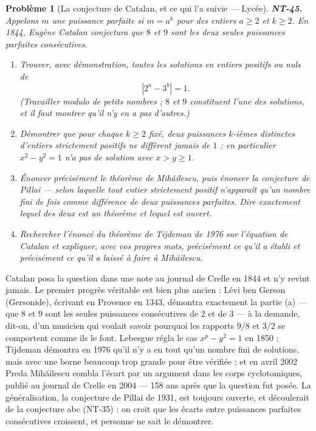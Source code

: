\documentclass[11pt]{article}
\newtheorem{problem}{Problème}
\begin{document}
\bigskip

\begin{problem}[{La conjecture de Catalan, et ce qui l'a suivie --- Lycée}]
\textbf{NT-45.} Appelons $ m $ une \textit{puissance parfaite} si $ m = a^k $ pour des entiers
$ a \ge 2 $ et $ k \ge 2 $. En 1844, Eugène Catalan conjectura que $ 8 $ et $ 9 $
sont les deux seules puissances parfaites consécutives.
\begin{enumerate}
\item[(a)] Trouver, avec démonstration, toutes les solutions en entiers positifs ou nuls de
\[ \left| 2^{a} - 3^{b} \right| = 1 . \]
(Travailler modulo de petits nombres ; $ 8 $ et $ 9 $ constituent l'une des solutions, et il faut
montrer qu'il n'y en a pas d'autres.)
\item[(b)] Démontrer que pour chaque $ k \ge 2 $ fixé, deux puissances $ k $-ièmes distinctes d'entiers
strictement positifs ne diffèrent jamais de $ 1 $ ; en particulier $ x^2 - y^2 = 1 $ n'a pas de
solution avec $ x > y \ge 1 $.
\item[(c)] Énoncer précisément le théorème de Mih\u{a}ilescu, puis énoncer la conjecture de Pillai --- selon
laquelle tout entier strictement positif n'apparaît qu'un nombre fini de fois comme différence de
deux puissances parfaites. Dire exactement lequel des deux est un théorème et lequel est ouvert.
\item[(d)] Rechercher l'énoncé du théorème de Tijdeman de 1976 sur l'équation de Catalan et expliquer, avec
vos propres mots, précisément ce qu'il a établi et précisément ce qu'il a laissé à faire à
Mih\u{a}ilescu.
\end{enumerate}

\end{problem}

\noindent Catalan posa la question dans une note au journal de Crelle en 1844 et n'y revint
jamais. Le premier progrès véritable est bien plus ancien : Lévi ben Gerson (Gersonide), écrivant en
Provence en 1343, démontra exactement la partie (a) --- que $ 8 $ et $ 9 $ sont les seules
puissances consécutives de $ 2 $ et de $ 3 $ --- à la demande, dit-on, d'un musicien qui voulait
savoir pourquoi les rapports $ 9/8 $ et $ 3/2 $ se comportent comme ils le font. Lebesgue régla
le cas $ x^p - y^2 = 1 $ en 1850 ; Tijdeman démontra en 1976 qu'il n'y a en tout qu'un nombre fini
de solutions, mais avec une borne beaucoup trop grande pour être vérifiée ; et en avril 2002 Preda
Mih\u{a}ilescu combla l'écart par un argument dans les corps cyclotomiques, publié au journal de Crelle
en 2004 --- 158 ans après que la question fut posée. La généralisation, la conjecture de Pillai de
1931, est toujours ouverte, et découlerait de la conjecture abc (NT-35) : on croit que les écarts
entre puissances parfaites consécutives croissent, et personne ne sait le démontrer.
\end{document}
